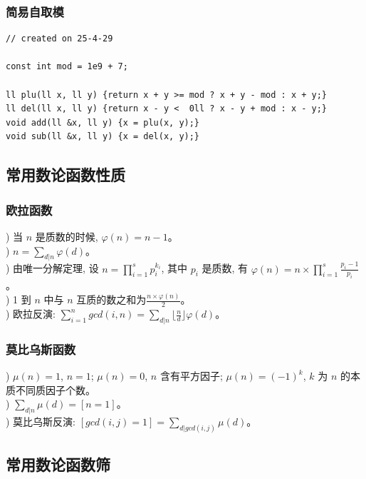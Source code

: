 \documentclass[a4paper,12pt]{article}
\begin{document}
\subsubsection{简易自取模}

\begin{lstlisting}
// created on 25-4-29

const int mod = 1e9 + 7;

ll plu(ll x, ll y) {return x + y >= mod ? x + y - mod : x + y;}
ll del(ll x, ll y) {return x - y <  0ll ? x - y + mod : x - y;}
void add(ll &x, ll y) {x = plu(x, y);}
void sub(ll &x, ll y) {x = del(x, y);}
\end{lstlisting}

\subsection{常用数论函数性质}

\subsubsection{欧拉函数}

) 当 $n$ 是质数的时候, $\varphi(n) = n-1$。 \\
) $n = \sum_{d|n} \varphi(d)$。 \\
) 由唯一分解定理, 设 $n = \prod_{i=1}^{s} p_i^{k_i}$, 其中 $p_i$ 是质数, 
有 $\varphi(n) = n \times \prod_{i=1}^s \frac{p_i - 1}{p_i}$。 \\
) 1 到 \( n \) 中与 \( n \) 互质的数之和为\(\frac{n \times \varphi(n)}{2}\)。\\
) 欧拉反演: \(\sum_{i=1}^{n} gcd(i,n) = \sum_{d|n} \lfloor \frac{n}{d} \rfloor \varphi(d)\)。



\subsubsection{莫比乌斯函数}

) $\mu(n) = 1$, $n = 1$; $\mu(n) = 0$, $n$ 含有平方因子; $\mu(n) = (-1)^k$, 
$k$ 为 $n$ 的本质不同质因子个数。 \\
) $\sum_{d|n} \mu(d) = [n = 1]$。\\
) 莫比乌斯反演: \([gcd(i,j)=1] = \sum_{d|gcd(i,j)} \mu(d)\)。


\subsection{常用数论函数筛}
\end{document}
